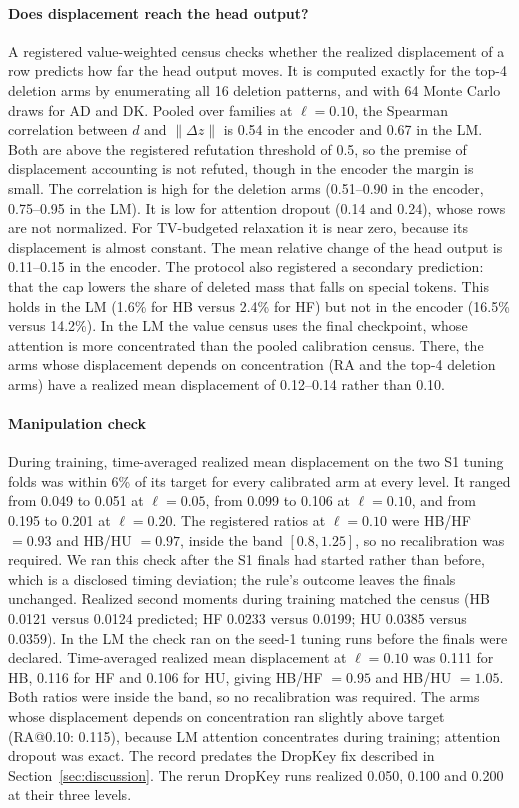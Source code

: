 \paragraph{Does displacement reach the head output?}
A registered value-weighted census checks whether the realized displacement of a row predicts how far the head
output moves. It is computed exactly for the top-4 deletion arms by enumerating all 16 deletion patterns, and with 64
Monte Carlo draws for AD and DK. Pooled over families at $\ell=0.10$, the Spearman correlation between $d$ and
$\lVert\Delta z\rVert$ is 0.54 in the encoder and 0.67 in the LM. Both are above the registered refutation
threshold of 0.5, so the premise of displacement accounting is not refuted, though in the encoder the margin is small.
The correlation is high for the deletion arms (0.51--0.90 in the encoder, 0.75--0.95 in the LM). It is low for
attention dropout (0.14 and 0.24), whose rows are not normalized. For TV-budgeted relaxation it is near zero,
because its displacement is almost constant. The mean relative change of the head output is 0.11--0.15 in the encoder.
The protocol also registered a secondary prediction: that the cap lowers the share of deleted mass that falls on special tokens.
This holds in the LM (1.6\% for HB versus 2.4\% for HF) but not in the encoder (16.5\% versus 14.2\%).
In the LM the value census uses the final checkpoint, whose attention is more concentrated than
the pooled calibration census. There, the arms whose displacement depends on concentration (RA and the top-4
deletion arms) have a realized mean displacement of 0.12--0.14 rather than 0.10.

\paragraph{Manipulation check}
During training, time-averaged realized mean displacement on the two S1 tuning folds was
within 6\% of its target for every calibrated arm at every level. It ranged from 0.049 to 0.051 at $\ell=0.05$, from 0.099 to 0.106
at $\ell=0.10$, and from 0.195 to 0.201 at $\ell=0.20$. The registered ratios at $\ell=0.10$ were HB/HF $=0.93$
and HB/HU $=0.97$, inside the band $[0.8,1.25]$, so no recalibration was required. We ran this check after the S1 finals had
started rather than before, which is a disclosed timing deviation; the rule's outcome
leaves the finals unchanged. Realized second moments during training matched the census
(HB 0.0121 versus 0.0124 predicted; HF 0.0233 versus 0.0199; HU 0.0385 versus 0.0359).
In the LM the check ran on the seed-1 tuning runs before the finals were declared. Time-averaged realized mean
displacement at $\ell=0.10$ was 0.111 for HB, 0.116 for HF and 0.106 for HU, giving HB/HF $=0.95$ and HB/HU $=1.05$.
Both ratios were inside the band, so no recalibration was required. The arms whose displacement depends on
concentration ran slightly above target (RA@0.10: 0.115), because LM attention concentrates during training; attention
dropout was exact. The record predates the DropKey fix described in Section~\ref{sec:discussion}. The rerun DropKey
runs realized 0.050, 0.100 and 0.200 at their three levels.
